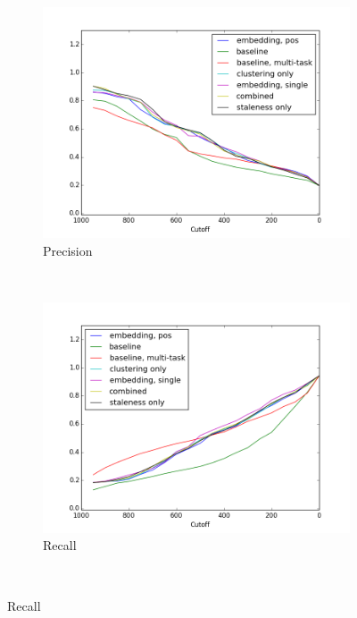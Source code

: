 \documentclass{article}
\begin{document}
\def \officialRunWidth {0.23\textwidth}
\begin{figure}[tb]
  \centering
    \begin{subfigure}[b]{\officialRunWidth}
            \includegraphics[width=\textwidth,clip=true,trim=15mm 0mm 15mm 5mm]{fig/microPrecision}
      \caption{Precision}
      \label{official:microprec}
    \end{subfigure}
    ~
    \begin{subfigure}[b]{\officialRunWidth}
            \includegraphics[width=\textwidth,clip=true,trim=15mm 0mm 15mm 5mm]{fig/microRecall}
      \caption{Recall}
      \label{official:microrecall}
    \end{subfigure}
    \\

\end{figure}
\end{document}
